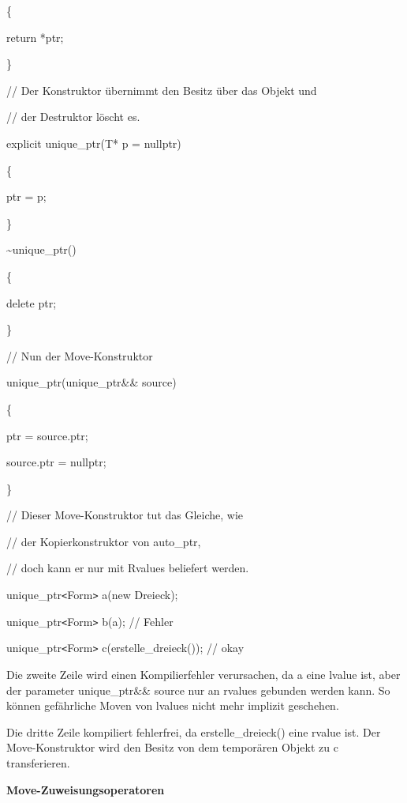 \documentclass{article}
\begin{document}
\parindent=28pt
\{        

return *ptr;    

\parindent=43pt
\}

\parindent=0pt
// Der Konstruktor übernimmt den Besitz über das Objekt und

// der Destruktor löscht es.    

\parindent=14pt
explicit unique\_ptr(T* p = nullptr)    

\{        

\parindent=43pt
ptr = p;    

\parindent=14pt
\}    

\vspace{12pt}
\textasciitilde{}unique\_ptr()    

\parindent=28pt
\{        

delete ptr;    

\parindent=43pt
\}

\parindent=0pt
// Nun der Move-Konstruktor    

unique\_ptr(unique\_ptr\&\& source)    

\parindent=14pt
\{        

\parindent=28pt
ptr = source.ptr;        

source.ptr = nullptr;    

\parindent=43pt
\}

\parindent=0pt
// Dieser Move-Konstruktor tut das Gleiche, wie

// der Kopierkonstruktor von auto\_ptr,

// doch kann er nur mit Rvalues beliefert werden.

unique\_ptr\texttt{<}Form\texttt{>} a(new Dreieck);

unique\_ptr\texttt{<}Form\texttt{>} b(a);                  // Fehler

unique\_ptr\texttt{<}Form\texttt{>} c(erstelle\_dreieck()); // okay

\vspace{12pt}
Die zweite Zeile wird einen Kompilierfehler verursachen, da a eine lvalue ist, 
aber der parameter unique\_ptr\&\& source nur an rvalues gebunden werden kann. 
So können gefährliche Moven von lvalues nicht mehr implizit geschehen.

Die dritte Zeile kompiliert fehlerfrei, da erstelle\_dreieck() eine rvalue ist. 
Der Move-Konstruktor wird den Besitz von dem temporären Objekt zu c transferieren.

\vspace{12pt}
\textbf{Move-Zuweisungsoperatoren}
\end{document}
